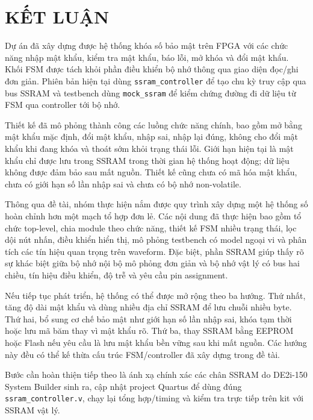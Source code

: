 \documentclass[13pt,a4paper]{article}
\begin{document}
\clearpage
\section{KẾT LUẬN}
Dự án đã xây dựng được hệ thống khóa số bảo mật trên FPGA với các chức năng nhập mật khẩu, kiểm tra mật khẩu, báo lỗi, mở khóa và đổi mật khẩu. Khối FSM được tách khỏi phần điều khiển bộ nhớ thông qua giao diện đọc/ghi đơn giản. Phiên bản hiện tại dùng \texttt{ssram\_controller} để tạo chu kỳ truy cập qua bus SSRAM và testbench dùng \texttt{mock\_ssram} để kiểm chứng đường đi dữ liệu từ FSM qua controller tới bộ nhớ.

Thiết kế đã mô phỏng thành công các luồng chức năng chính, bao gồm mở bằng mật khẩu mặc định, đổi mật khẩu, nhập sai, nhập lại đúng, không cho đổi mật khẩu khi đang khóa và thoát sớm khỏi trạng thái lỗi. Giới hạn hiện tại là mật khẩu chỉ được lưu trong SSRAM trong thời gian hệ thống hoạt động; dữ liệu không được đảm bảo sau mất nguồn. Thiết kế cũng chưa có mã hóa mật khẩu, chưa có giới hạn số lần nhập sai và chưa có bộ nhớ non-volatile.

Thông qua đề tài, nhóm thực hiện nắm được quy trình xây dựng một hệ thống số hoàn chỉnh hơn một mạch tổ hợp đơn lẻ. Các nội dung đã thực hiện bao gồm tổ chức top-level, chia module theo chức năng, thiết kế FSM nhiều trạng thái, lọc dội nút nhấn, điều khiển hiển thị, mô phỏng testbench có model ngoại vi và phân tích các tín hiệu quan trọng trên waveform. Đặc biệt, phần SSRAM giúp thấy rõ sự khác biệt giữa bộ nhớ nội bộ mô phỏng đơn giản và bộ nhớ vật lý có bus hai chiều, tín hiệu điều khiển, độ trễ và yêu cầu pin assignment.

Nếu tiếp tục phát triển, hệ thống có thể được mở rộng theo ba hướng. Thứ nhất, tăng độ dài mật khẩu và dùng nhiều địa chỉ SSRAM để lưu chuỗi nhiều byte. Thứ hai, bổ sung cơ chế bảo mật như giới hạn số lần nhập sai, khóa tạm thời hoặc lưu mã băm thay vì mật khẩu rõ. Thứ ba, thay SSRAM bằng EEPROM hoặc Flash nếu yêu cầu là lưu mật khẩu bền vững sau khi mất nguồn. Các hướng này đều có thể kế thừa cấu trúc FSM/controller đã xây dựng trong đề tài.

Bước cần hoàn thiện tiếp theo là ánh xạ chính xác các chân SSRAM do DE2i-150 System Builder sinh ra, cập nhật project Quartus để dùng đúng \texttt{ssram\_controller.v}, chạy lại tổng hợp/timing và kiểm tra trực tiếp trên kit với SSRAM vật lý.

\newpage
\end{document}

